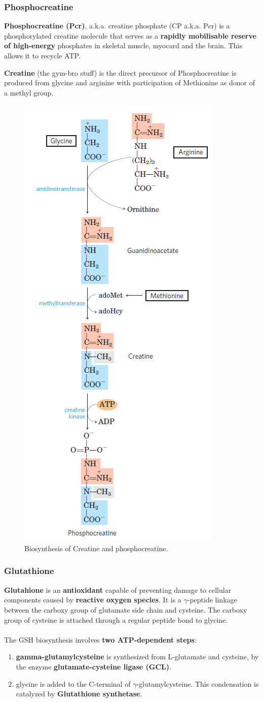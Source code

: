 \documentclass[../main.tex]{subfiles}
\begin{document}
\subsubsection{Phosphocreatine}

\textbf{\gls{Phosphocreatine (Pcr)}}, a.k.a. creatine phosphate (CP a.k.a. Pcr) is a phosphorylated creatine molecule that serves as a \textbf{rapidly mobilisable reserve of high-energy} phosphates in skeletal muscle, myocard and the brain. This allows it to recycle ATP. 

\textbf{\gls{Creatine}} (the gym-bro stuff) is the direct precursor of Phosphocreatine is produced from glycine and arginine with participation of Methionine as donor of a methyl group.

\begin{figure}[H]
	\centering
	\includegraphics[width=0.3\linewidth]{creatine}
	\caption{Biosynthesis of Creatine and phosphocreatine.}
	\label{fig:creatine}
\end{figure}


\subsubsection{Glutathione}

\textbf{\gls{Glutahione}} is an \textbf{antioxidant} capable of preventing damage to cellular components caused by \textbf{reactive oxygen species}. It is a $\gamma$-peptide linkage between the carboxy group of glutamate side chain and cysteine. The carboxy group of cysteine is attached through a regular peptide bond to glycine. \\
\\
The GSH biosynthesis involves \textbf{two ATP-dependent steps}:
\begin{enumerate}
	\item \textbf{\gls{gamma-glutamylcysteine}} is synthesized from L-glutamate and cysteine, by the enzyme \textbf{\gls{glutamate-cysteine ligase (GCL)}}.
	\item glycine is added to the C-terminal of $\gamma$-glutamylcysteine. This condensation is catalyzed by \textbf{\gls{Glutathione synthetase}}.
\end{enumerate}
\end{document}
